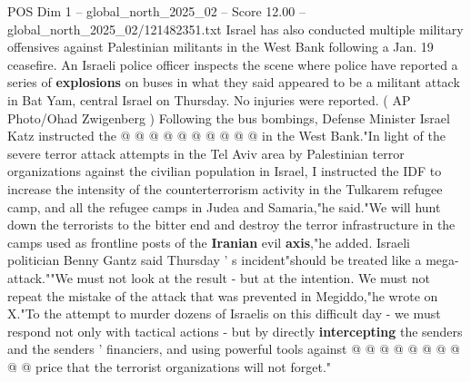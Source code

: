\begin{textsample}{POS Dim 1 – global\_north\_2025\_02 – Score 12.00 – global\_north\_2025\_02/121482351.txt}
Israel has also conducted multiple military offensives against Palestinian militants in the West Bank following a Jan. 19 ceasefire.
An Israeli police officer inspects the scene where police have reported a series of \textbf{explosions} on buses in what they said appeared to be a militant attack in Bat Yam, central Israel on Thursday.
No injuries were reported. ( AP Photo/Ohad Zwigenberg ) Following the bus bombings, Defense Minister Israel Katz instructed the @ @ @ @ @ @ @ @ @ @ in the West Bank."In light of the severe terror attack attempts in the Tel Aviv area by Palestinian terror organizations against the civilian population in Israel, I instructed the IDF to increase the intensity of the counterterrorism activity in the Tulkarem refugee camp, and all the refugee camps in Judea and Samaria,"he said."We will hunt down the terrorists to the bitter end and destroy the terror infrastructure in the camps used as frontline posts of the \textbf{Iranian} evil \textbf{axis},"he added.
Israeli politician Benny Gantz said Thursday ' s incident"should be treated like a mega-attack.""We must not look at the result - but at the intention.
We must not repeat the mistake of the attack that was prevented in Megiddo,"he wrote on X."To the attempt to murder dozens of Israelis on this difficult day - we must respond not only with tactical actions - but by directly \textbf{intercepting} the senders and the senders ' financiers, and using powerful tools against @ @ @ @ @ @ @ @ @ @ price that the terrorist organizations will not forget."

\end{textsample}
